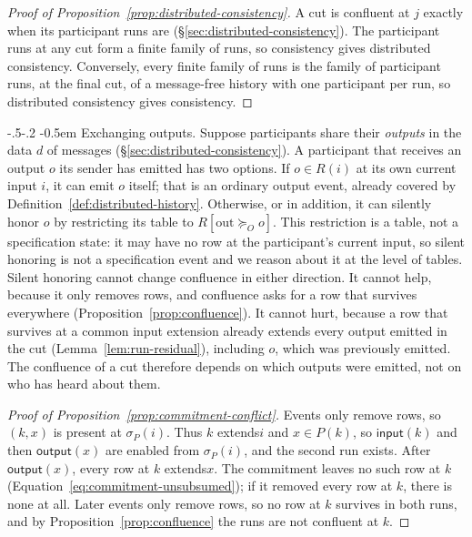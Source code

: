 \documentclass[sigconf]{cidr-2027}
\makeatletter
\theoremstyle{remark}
\renewcommand\paragraph{\@startsection{paragraph}{4}{\z@}%
  {-.5\baselineskip \@plus -2\p@ \@minus -.2\p@}%
  {-0.5em}%
  {\normalfont\bfseries}}
\newcommand{\OutputGe}{\succeq_O}
\newcommand{\commitment}{commitment\xspace}
\newcommand{\inrel}{extends\xspace}          %
\newcommand{\indesc}{input extension\xspace} %
\newcommand{\outrel}{extends\xspace}          %
\newcommand{\fiber}[1]{P(#1)}
\makeatother
\begin{document}
\color{blue!70!black}\begin{proof}[Proof of Proposition~\ref{prop:distributed-consistency}]
A cut is confluent at $j$ exactly when its participant runs are
(\S\ref{sec:distributed-consistency}).  The participant runs at any cut form a
finite family of runs, so consistency gives distributed consistency.
Conversely, every finite family of runs is the family of participant runs, at
the final cut, of a message-free history with one participant per run, so
distributed consistency gives consistency.\color{black}
\end{proof}

\paragraph{Exchanging outputs.}
\label{app:exchanging-outputs}
Suppose participants share their \emph{outputs} in the data $d$ of messages
(\S\ref{sec:distributed-consistency}).  A participant that receives an
output $o$ its sender has emitted has two
options.  If $o\in R(i)$ at its own current input $i$, it can emit $o$ itself;
that is an ordinary output event, already covered by
Definition~\ref{def:distributed-history}.
Otherwise, or in addition, it can silently honor $o$ by restricting its table
to $R[\mathrm{out}\OutputGe o]$.  This restriction is a table, not a
specification state: it may have no row at the participant's current input,
so silent honoring is not a specification event and we reason about it at the level of
tables.  Silent honoring cannot change confluence in either direction.  It cannot
help, because it only removes rows, and confluence asks for a row that
survives everywhere (Proposition~\ref{prop:confluence}).  It cannot hurt,
because a row that survives at a common \indesc already \outrel every output
emitted in the cut (Lemma~\ref{lem:run-residual}), including $o$, which was previously emitted.
The confluence of a cut therefore depends on which outputs were emitted,
not on who has heard about them.

\begin{proof}[Proof of Proposition~\ref{prop:commitment-conflict}]
Events only remove rows, so $(k,x)$ is present at $\sigma_P(i)$.  Thus $k$
\inrel $i$ and $x\in\fiber{k}$, so $\mathsf{input}(k)$ and then
$\mathsf{output}(x)$ are enabled from $\sigma_P(i)$, and the second run
exists.  After $\mathsf{output}(x)$, every row at $k$ \outrel $x$.  The
\commitment leaves no such row at $k$
(Equation~\ref{eq:commitment-unsubsumed}); if it removed every row at $k$,
there is none at all.  Later events only remove rows, so no row at $k$
survives in both runs, and by Proposition~\ref{prop:confluence} the runs are
not confluent at $k$.
\end{proof}
\end{document}
